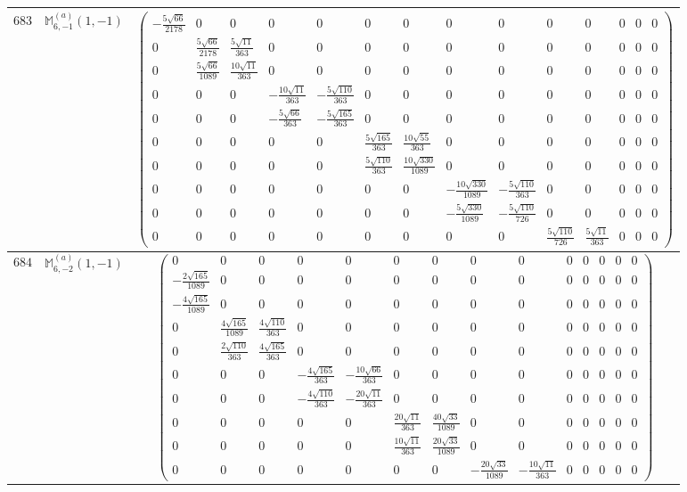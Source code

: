 \documentclass[fleqn,8pt,landscape]{jsarticle}
\begin{document}
\begin{center}
\begin{longtable}{ccc}
$ 683 $ & $ \mathbb{M}_{6,-1}^{(a)}(1,-1) $ & $ \begin{pmatrix} - \frac{5 \sqrt{66}}{2178} & 0 & 0 & 0 & 0 & 0 & 0 & 0 & 0 & 0 & 0 & 0 & 0 & 0 \\ 0 & \frac{5 \sqrt{66}}{2178} & \frac{5 \sqrt{11}}{363} & 0 & 0 & 0 & 0 & 0 & 0 & 0 & 0 & 0 & 0 & 0 \\ 0 & \frac{5 \sqrt{66}}{1089} & \frac{10 \sqrt{11}}{363} & 0 & 0 & 0 & 0 & 0 & 0 & 0 & 0 & 0 & 0 & 0 \\ 0 & 0 & 0 & - \frac{10 \sqrt{11}}{363} & - \frac{5 \sqrt{110}}{363} & 0 & 0 & 0 & 0 & 0 & 0 & 0 & 0 & 0 \\ 0 & 0 & 0 & - \frac{5 \sqrt{66}}{363} & - \frac{5 \sqrt{165}}{363} & 0 & 0 & 0 & 0 & 0 & 0 & 0 & 0 & 0 \\ 0 & 0 & 0 & 0 & 0 & \frac{5 \sqrt{165}}{363} & \frac{10 \sqrt{55}}{363} & 0 & 0 & 0 & 0 & 0 & 0 & 0 \\ 0 & 0 & 0 & 0 & 0 & \frac{5 \sqrt{110}}{363} & \frac{10 \sqrt{330}}{1089} & 0 & 0 & 0 & 0 & 0 & 0 & 0 \\ 0 & 0 & 0 & 0 & 0 & 0 & 0 & - \frac{10 \sqrt{330}}{1089} & - \frac{5 \sqrt{110}}{363} & 0 & 0 & 0 & 0 & 0 \\ 0 & 0 & 0 & 0 & 0 & 0 & 0 & - \frac{5 \sqrt{330}}{1089} & - \frac{5 \sqrt{110}}{726} & 0 & 0 & 0 & 0 & 0 \\ 0 & 0 & 0 & 0 & 0 & 0 & 0 & 0 & 0 & \frac{5 \sqrt{110}}{726} & \frac{5 \sqrt{11}}{363} & 0 & 0 & 0 \end{pmatrix} $ \\ \hline
$ 684 $ & $ \mathbb{M}_{6,-2}^{(a)}(1,-1) $ & $ \begin{pmatrix} 0 & 0 & 0 & 0 & 0 & 0 & 0 & 0 & 0 & 0 & 0 & 0 & 0 & 0 \\ - \frac{2 \sqrt{165}}{1089} & 0 & 0 & 0 & 0 & 0 & 0 & 0 & 0 & 0 & 0 & 0 & 0 & 0 \\ - \frac{4 \sqrt{165}}{1089} & 0 & 0 & 0 & 0 & 0 & 0 & 0 & 0 & 0 & 0 & 0 & 0 & 0 \\ 0 & \frac{4 \sqrt{165}}{1089} & \frac{4 \sqrt{110}}{363} & 0 & 0 & 0 & 0 & 0 & 0 & 0 & 0 & 0 & 0 & 0 \\ 0 & \frac{2 \sqrt{110}}{363} & \frac{4 \sqrt{165}}{363} & 0 & 0 & 0 & 0 & 0 & 0 & 0 & 0 & 0 & 0 & 0 \\ 0 & 0 & 0 & - \frac{4 \sqrt{165}}{363} & - \frac{10 \sqrt{66}}{363} & 0 & 0 & 0 & 0 & 0 & 0 & 0 & 0 & 0 \\ 0 & 0 & 0 & - \frac{4 \sqrt{110}}{363} & - \frac{20 \sqrt{11}}{363} & 0 & 0 & 0 & 0 & 0 & 0 & 0 & 0 & 0 \\ 0 & 0 & 0 & 0 & 0 & \frac{20 \sqrt{11}}{363} & \frac{40 \sqrt{33}}{1089} & 0 & 0 & 0 & 0 & 0 & 0 & 0 \\ 0 & 0 & 0 & 0 & 0 & \frac{10 \sqrt{11}}{363} & \frac{20 \sqrt{33}}{1089} & 0 & 0 & 0 & 0 & 0 & 0 & 0 \\ 0 & 0 & 0 & 0 & 0 & 0 & 0 & - \frac{20 \sqrt{33}}{1089} & - \frac{10 \sqrt{11}}{363} & 0 & 0 & 0 & 0 & 0 \end{pmatrix} $ \\ \hline

\end{longtable}
\end{center}
\end{document}
